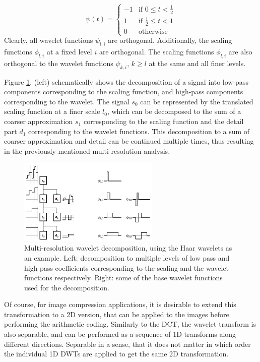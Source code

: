 \documentclass{diploma_style}
\begin{document}
\begin{equation}
\psi(t) = 
\begin{cases}
	-1 & \text{if } 0 \leq t < \frac{1}{2} \\
	1 & \text{if } \frac{1}{2} \leq t < 1 \\
	0 & \text{otherwise}
\end{cases}
\label{eq:wavelet}
\end{equation}
Clearly, all wavelet functions $\psi_{l,i}$ are orthogonal. Additionally, the scaling functions $\phi_{l,i}$ at a fixed level $i$ are orthogonal. The scaling functions $\phi_{l,i}$ are also orthogonal to the wavelet functions $\psi_{k,i}$, $k \geq l$ at the same and all finer levels.

Figure \ref{fig:wavelet}. (left) schematically shows the decomposition of a signal into low-pass components corresponding to the scaling function, and high-pass components corresponding to the wavelet. The signal $s_0$ can be represented by the translated scaling function at a finer scale $l_0$, which can be decomposed to the sum of a coarser approximation $s_1$ corresponding to the scaling function and the detail part $d_1$ corresponding to the wavelet functions. This decomposition to a sum of coarser approximation and detail can be continued multiple times, thus resulting in the previously mentioned multi-resolution analysis.


\begin{figure}
\centering
\includegraphics[width=0.6\textwidth]{figures/3_compression/wavelet}
\caption{Multi-resolution wavelet decomposition, using the Haar wavelets as an example. Left: decomposition to multiple levels of low pass and high pass coefficients corresponding to the scaling and the wavelet functions respectively. Right: some of the base wavelet functions used for the decomposition.}
\label{fig:wavelet}
\end{figure}


Of course, for image compression applications, it is desirable to extend this transformation to a 2D version, that can be applied to the images before performing the arithmetic coding. Similarly to the DCT, the wavelet transform is also separable, and can be performed as a sequence of 1D transforms along different directions. Separable in a sense, that it does not matter in which order the individual 1D DWTs are applied to get the same 2D transformation.
\end{document}
